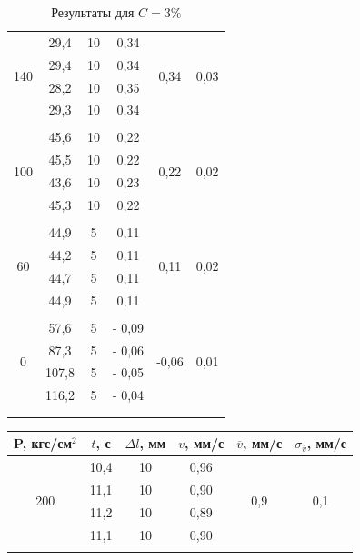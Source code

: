 \documentclass[a4paper, 12pt]{article}%
\begin{document}
\begin{enumerate}
\begin{longtable} {|c|c|c|c|c|c|}
		  \multirow{4}{*}{140}& 29,4 & 10 & 0,34 &  \multirow{4}{*}{0,34}    & \multirow{4}{*}{0,03}\\ \cline{2-4}
		 & 29,4 & 10 &    0,34         &               &\\ \cline{2-4}
		 & 28,2 & 10 &     0,35         &              & \\ \cline{2-4}
		 & 29,3 & 10 &    0,34           &             &\\ \hline
		 &&&&&\\ \hline
		 
		  \multirow{4}{*}{100}& 45,6 & 10 & 0,22 &  \multirow{4}{*}{0,22}    & \multirow{4}{*}{0,02}\\ \cline{2-4}
		 & 45,5 & 10 &    0,22         &               &\\ \cline{2-4}
		 & 43,6 & 10 &     0,23         &              & \\ \cline{2-4}
		 & 45,3 & 10 &    0,22           &             &\\ \hline
		 &&&&&\\ \hline
		 
		  \multirow{4}{*}{60}& 44,9 & 5 & 0,11 &  \multirow{4}{*}{0,11}    & \multirow{4}{*}{0,02}\\ \cline{2-4}
		 & 44,2 & 5 &    0,11         &               &\\ \cline{2-4}
		 & 44,7 & 5 &     0,11         &              & \\ \cline{2-4}
		 & 44,9 & 5 &    0,11           &             &\\ \hline
		 &&&&&\\ \hline
		 
		 \multirow{4}{*}{0}& 57,6 & 5 & - 0,09 &  \multirow{4}{*}{-0,06}    & \multirow{4}{*}{0,01}\\ \cline{2-4}
		 & 87,3 & 5 &    - 0,06         &               &\\ \cline{2-4}
		 &107,8 & 5 &     - 0,05         &              & \\ \cline{2-4}
		 & 116,2 & 5 &   - 0,04           &             &\\ \hline
		 &&&&&\\ \hline
		\caption{Результаты для $ C = 3\% $  }
	\end{longtable}
	
	\newpage
	
	
	\begin{longtable} {|c|c|c|c|c|c|}
		\hline
		P, кгс/см$^2$ & $ t $, с &   $ \Delta l$, мм  & $v$,  мм/с   & $\overline v $, мм/с & $\sigma_{\overline v}$, мм/с\\ \hline
		\multirow{4}{*}{200}& 10,4 & 10 & 0,96 &  \multirow{4}{*}{0,9}    & \multirow{4}{*}{0,1}\\ \cline{2-4}
		& 11,1 & 10 &    0,90         &               &\\ \cline{2-4}
		& 11,2 & 10 &     0,89         &              & \\ \cline{2-4}
		& 11,1 & 10 &    0,90           &             &\\ \hline
		&&&&&\\ \hline
		

\end{longtable}
\end{enumerate}
\end{document}
